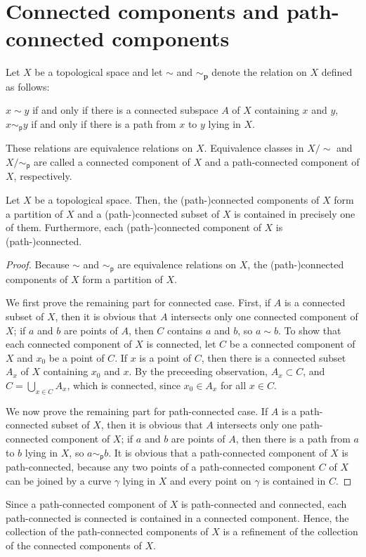 \section{Connected components and path-connected components}

\begin{defi}
    Let $X$ be a topological space and let $\sim$ and $\sim_\textbf{p}$ denote the relation on $X$ defined as follows:
    \begin{center}
        $x\sim y$ if and only if there is a connected subspace $A$ of $X$ containing $x$ and $y$,\\
        $x\sim_\textsf{p} y$ if and only if there is a path from $x$ to $y$ lying in $X$.
    \end{center}
    These relations are equivalence relations on $X$.
    Equivalence classes in $X/\sim$ and $X/\sim_\textsf{p}$ are called a connected component of $X$ and a path-connected component of $X$, respectively.
\end{defi}

\begin{prop}
    Let $X$ be a topological space.
    Then, the (path-)connected components of $X$ form a partition of $X$ and a (path-)connected subset of $X$ is contained in precisely one of them.
    Furthermore, each (path-)connected component of $X$ is (path-)connected.
\end{prop}
\begin{proof}
    Because $\sim$ and $\sim_\textsf{p}$ are equivalence relations on $X$, the (path-)connected components of $X$ form a partition of $X$.
    
    We first prove the remaining part for connected case.
    First, if $A$ is a connected subset of $X$, then it is obvious that $A$ intersects only one connected component of $X$; if $a$ and $b$ are points of $A$, then $C$ contains $a$ and $b$, so $a\sim b$.
    To show that each connected component of $X$ is connected, let $C$ be a connected component of $X$ and $x_0$ be a point of $C$.
    If $x$ is a point of $C$, then there is a connected subset $A_x$ of $X$ containing $x_0$ and $x$.
    By the preceeding observation, $A_x\subset C$, and $C=\bigcup_{x\in C} A_x$, which is connected, since $x_0\in A_x$ for all $x\in C$.

    We now prove the remaining part for path-connected case.
    If $A$ is a path-connected subset of $X$, then it is obvious that $A$ intersects only one path-connected component of $X$; if $a$ and $b$ are points of $A$, then there is a path from $a$ to $b$ lying in $X$, so $a\sim_\textsf{p} b$.
    It is obvious that a path-connected component of $X$ is path-connected, because any two points of a path-connected component $C$ of $X$ can be joined by a curve $\gamma$ lying in $X$ and every point on $\gamma$ is contained in $C$.
\end{proof}
\begin{rmk}
    Since a path-connected component of $X$ is path-connected and connected, each path-connected is connected is contained in a connected component.
    Hence, the collection of the path-connected components of $X$ is a refinement of the collection of the connected components of $X$.
\end{rmk}

